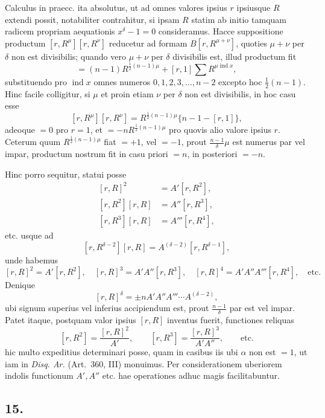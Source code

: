 \documentclass[12pt]{article}
\begin{document}
Calculus in praecc. ita absolutus, ut ad omnes valores ipsius $r$ ipsiusque $R$ extendi possit, notabiliter contrahitur, si ipsam $R$ statim ab initio tamquam radicem propriam aequationis $x^\delta-1=0$ consideramus. Hacce suppositione productum $[r,R^\mu][r,R^\nu]$ reducetur ad formam $B[r,R^{\mu+\nu}]$, quoties $\mu+\nu$ per $\delta$ non est divisibilis; quando vero $\mu+\nu$ per $\delta$ divisibilis est, illud productum fit
\[
=(n-1)R^{\frac12(n-1)\mu}+[r,1]\sum R^{\mu\operatorname{ind}x},
\]
substituendo pro $\operatorname{ind}x$ omnes numeros $0,1,2,3,\ldots,n-2$ excepto hoc $\frac12(n-1)$. Hinc facile colligitur, si $\mu$ et proin etiam $\nu$ per $\delta$ non est divisibilis, in hoc casu esse
\[
[r,R^\mu][r,R^\nu]=R^{\frac12(n-1)\mu}\{n-1-[r,1]\},
\]
adeoque $=0$ pro $r=1$, et $=-nR^{\frac12(n-1)\mu}$ pro quovis alio valore ipsius $r$. Ceterum quum $R^{\frac12(n-1)\mu}$ fiat $=+1$, vel $=-1$, prout $\frac{n-1}{\delta}\mu$ est numerus par vel impar, productum nostrum fit in casu priori $=n$, in posteriori $=-n$.

Hinc porro sequitur, statui posse
\[
\begin{aligned}
[r,R]^2&=A'[r,R^2],\\
[r,R^2][r,R]&=A''[r,R^3],\\
[r,R^3][r,R]&=A'''[r,R^4],
\end{aligned}
\]
etc. usque ad
\[
[r,R^{\delta-2}][r,R]=A^{(\delta-2)}[r,R^{\delta-1}],
\]
unde habemus
\[
[r,R]^2=A'[r,R^2],\quad
[r,R]^3=A'A''[r,R^3],\quad
[r,R]^4=A'A''A'''[r,R^4],\quad\text{etc.}
\]
Denique
\[
[r,R]^\delta=\pm nA'A''A'''\cdots A^{(\delta-2)},
\]
ubi signum superius vel inferius accipiendum est, prout $\frac{n-1}{\delta}$ par est vel impar. Patet itaque, postquam valor ipsius $[r,R]$ inventus fuerit, functiones reliquas
\[
[r,R^2]=\frac{[r,R]^2}{A'},\qquad
[r,R^3]=\frac{[r,R]^3}{A'A''},\qquad\text{etc.}
\]
hic multo expeditius determinari posse, quam in casibus iis ubi $\alpha$ non est $=1$, ut iam in \emph{Disq. Ar.} (Art.~360, III) monuimus. Per considerationem uberiorem indolis functionum $A',A''$ etc. hae operationes adhuc magis facilitabuntur.

\subsection*{15.}
\end{document}
